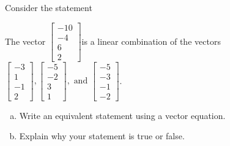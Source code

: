 
\begin{exerciseStatement}


Consider the statement 
\begin{center}\begin{minipage}{0.8\textwidth}
 The vector \( \left[\begin{array}{c}
-10 \\
-4 \\
6 \\
2
\end{array}\right] \)is a linear combination of the vectors \( \left[\begin{array}{c}
-3 \\
1 \\
-1 \\
2
\end{array}\right] , \left[\begin{array}{c}
-5 \\
-2 \\
3 \\
1
\end{array}\right] , \text{ and } \left[\begin{array}{c}
-5 \\
-3 \\
-1 \\
-2
\end{array}\right] \). 
\end{minipage}\end{center}
    


\begin{enumerate}[(a)]
\item  Write an equivalent statement using a vector equation.
\item  Explain why your statement is true or false.
\end{enumerate}
    
\end{exerciseStatement}
    
